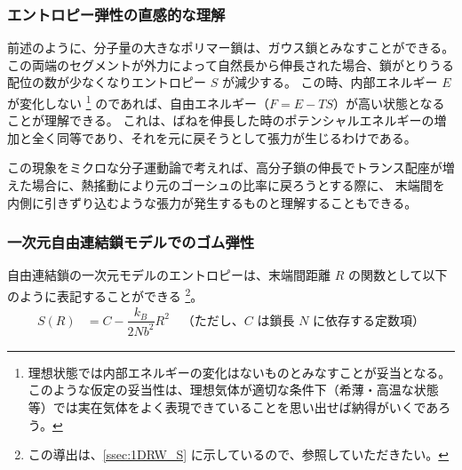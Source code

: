 \documentclass[a4paper,11pt]{ltjsarticle}
\begin{document}

\subsubsection{エントロピー弾性の直感的な理解}

前述のように、分子量の大きなポリマー鎖は、ガウス鎖とみなすことができる。
この両端のセグメントが外力によって自然長から伸長された場合、鎖がとりうる配位の数が少なくなりエントロピー $S$ が減少する。
この時、内部エネルギー $E$ が変化しない
\footnote
{
理想状態では内部エネルギーの変化はないものとみなすことが妥当となる。
このような仮定の妥当性は、理想気体が適切な条件下（希薄・高温な状態等）では実在気体をよく表現できていることを思い出せば納得がいくであろう。
}
のであれば、自由エネルギー（$F=E-TS$）が高い状態となることが理解できる。
これは、ばねを伸長した時のポテンシャルエネルギーの増加と全く同等であり、それを元に戻そうとして張力が生じるわけである。

この現象をミクロな分子運動論で考えれば、高分子鎖の伸長でトランス配座が増えた場合に、熱搖動により元のゴーシュの比率に戻ろうとする際に、
末端間を内側に引きずり込むような張力が発生するものと理解することもできる。

\subsubsection{一次元自由連結鎖モデルでのゴム弾性}

自由連結鎖の一次元モデルのエントロピーは、末端間距離 $R$ の関数として以下のように表記することができる
\footnote
{
この導出は、\ref{ssec:1DRW_S} に示しているので、参照していただきたい。
}。
\begin{align*}
S(R)
	&= C -\dfrac{ k_B}{2Nb^2}R^2 \quad \text{（ただし、$C$ は鎖長 $N$ に依存する定数項）}
\end{align*}
\end{document}
